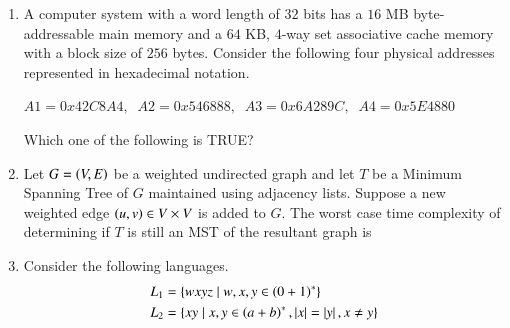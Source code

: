 \documentclass[journal,12pt,onecolumn]{IEEEtran}
\theoremstyle{remark}
\begin{document}
\begin{enumerate}
	
	\item A computer system with a word length of $32$ bits has a $16$ MB byte-addressable main memory and a $64$ KB, $4$-way set associative cache memory with a block size of $256$ bytes. Consider the following four physical addresses represented in hexadecimal notation.
	
	$A1 = 0x42C8A4,\;\; A2 = 0x546888,\;\; A3 = 0x6A289C,\;\; A4 = 0x5E4880$
	
	Which one of the following is TRUE?
		\hfill{}
	\begin{enumerate}
	\end{enumerate}
	

	
	\item Let $G = \left(V,E\right)$ be a weighted undirected graph and let $T$ be a Minimum Spanning Tree  of $G$ maintained using adjacency lists. Suppose a new weighted edge $\left(u,v\right) \in V \times V$ is added to $G$. The worst case time complexity of determining if $T$ is still an MST of the resultant graph is
		\hfill{\brak{\text{GATE CS 2020}}}
	\begin{enumerate}
		\begin{multicols}{4}
			\item $\Theta\brak{\abs{E} + \abs{V}}$
			\item $\Theta\brak{\abs{E}\abs{V}}$
			\item $\Theta\brak{\abs{E}\log \abs{V}}$
			\item $\Theta\brak{\abs{V}}$
		\end{multicols}
	\end{enumerate}
	

	
	\item Consider the following languages.
	\begin{align*}
		L_{1} &= \{w x y z \mid w,x,y \in \left(0+1\right)^{*}\} \\
		L_{2} &= \{x y \mid x,y \in \left(a+b\right)^{*}, \left\vert x\right\vert=\left\vert y\right\vert, x \neq y\}
	\end{align*}
	

\end{enumerate}
\end{document}
